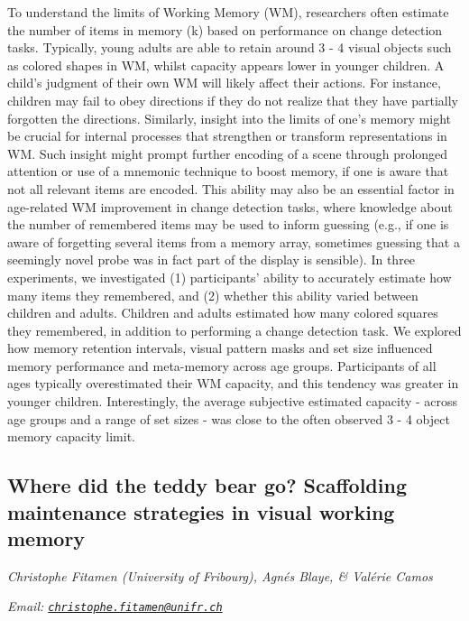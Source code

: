 \documentclass[12pt,]{book}
\begin{document}
To understand the limits of Working Memory (WM), researchers often estimate the number of items in memory (k) based on performance on change detection tasks. Typically, young adults are able to retain around 3 - 4 visual objects such as colored shapes in WM, whilst capacity appears lower in younger children. A child's judgment of their own WM will likely affect their actions. For instance, children may fail to obey directions if they do not realize that they have partially forgotten the directions. Similarly, insight into the limits of one's memory might be crucial for internal processes that strengthen or transform representations in WM. Such insight might prompt further encoding of a scene through prolonged attention or use of a mnemonic technique to boost memory, if one is aware that not all relevant items are encoded. This ability may also be an essential factor in age-related WM improvement in change detection tasks, where knowledge about the number of remembered items may be used to inform guessing (e.g., if one is aware of forgetting several items from a memory array, sometimes guessing that a seemingly novel probe was in fact part of the display is sensible). In three experiments, we investigated (1) participants' ability to accurately estimate how many items they remembered, and (2) whether this ability varied between children and adults. Children and adults estimated how many colored squares they remembered, in addition to performing a change detection task. We explored how memory retention intervals, visual pattern masks and set size influenced memory performance and meta-memory across age groups. Participants of all ages typically overestimated their WM capacity, and this tendency was greater in younger children. Interestingly, the average subjective estimated capacity - across age groups and a range of set sizes - was close to the often observed 3 - 4 object memory capacity limit.

\hypertarget{where-did-the-teddy-bear-go-scaffolding-maintenance-strategies-in-visual-working-memory}{%
\subsection{Where did the teddy bear go? Scaffolding maintenance strategies in visual working memory}\label{where-did-the-teddy-bear-go-scaffolding-maintenance-strategies-in-visual-working-memory}}

\emph{Christophe Fitamen (University of Fribourg), Agnés Blaye, \& Valérie Camos}

\emph{Email: \href{mailto:christophe.fitamen@unifr.ch}{\nolinkurl{christophe.fitamen@unifr.ch}}}
\end{document}
